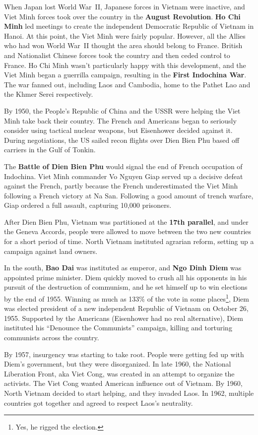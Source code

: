 When Japan lost World War~II, Japanese forces in Vietnam were inactive,
and Viet Minh forces took over the country in the \textbf{August Revolution}.
\textbf{Ho Chi Minh} led meetings to create the independent Democratic Republic of Vietnam in Hanoi.
At this point, the Viet Minh were fairly popular.
However, all the Allies who had won World War~II thought the area should belong to France.
British and Nationalist Chinese forces took the country and then ceded control to France.
Ho Chi Minh wasn't particularly happy with this development,
and the Viet Minh began a guerrilla campaign, resulting in the \textbf{First Indochina War}.
The war fanned out, including Laos and Cambodia, home to the Pathet Lao and the Khmer Serei respectively.

By 1950, the People's Republic of China and the USSR were helping the Viet Minh take back their country.
The French and Americans began to seriously consider using tactical nuclear weapons,
but Eisenhower decided against it.
During negotiations, the US sailed recon flights over Dien Bien Phu based off carriers in the Gulf of Tonkin.

The \textbf{Battle of Dien Bien Phu} would signal the end of French occupation of Indochina.
Viet Minh commander Vo Nguyen Giap served up a decisive defeat against the French,
partly because the French underestimated the Viet Minh following a French victory at Na San.
Following a good amount of trench warfare, Giap ordered a full assault, capturing 10,000 prisoners.

After Dien Bien Phu, Vietnam was partitioned at the \textbf{17th parallel},
and under the Geneva Accords, people were allowed to move between the two new countries for a short period of time.
North Vietnam instituted agrarian reform, setting up a campaign against land owners.

In the south, \textbf{Bao Dai} was instituted as emperor, and \textbf{Ngo Dinh Diem} was appointed prime minister.
Diem quickly moved to crush all his opponents in his pursuit of the destruction of communism,
and he set himself up to win elections by the end of 1955.
Winning as much as 133\% of the vote in some places\footnote{Yes, he rigged the election.},
Diem was elected president of a new independent Republic of Vietnam on October 26, 1955.
Supported by the Americans (Eisenhower had no real alternative),
Diem instituted his ``Denounce the Communists'' campaign, killing and torturing communists across the country.

By 1957, insurgency was starting to take root.
People were getting fed up with Diem's government, but they were disorganized.
In late 1960, the National Liberation Front, aka Viet Cong, was created in an attempt to organize the activists.
The Viet Cong wanted American influence out of Vietnam.
By 1960, North Vietnam decided to start helping, and they invaded Laos.
In 1962, multiple countries got together and agreed to respect Laos's neutrality.

